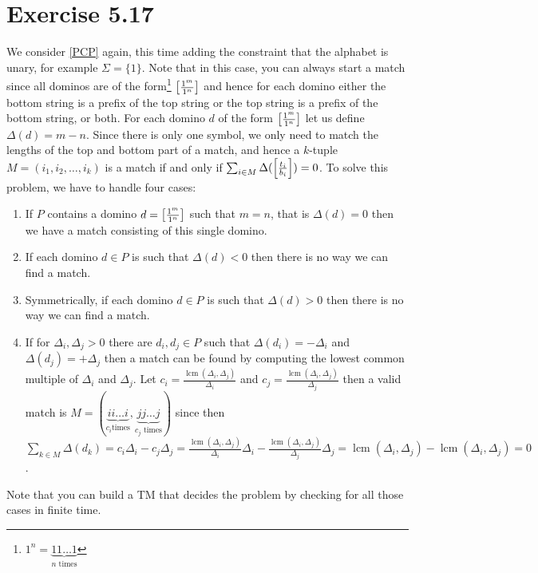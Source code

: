 \documentclass{article}
\begin{document}
\section{Exercise 5.17}
We consider \ref{PCP} again, this time adding the constraint that the alphabet
is unary, for example \(\Sigma = \{1\}\). Note that in this case, you can always start a
match since all dominos are of the form\footnote{\(1^n = \underbrace{11\ldots1}_{n \text{ times}}\)}
\(\mleft[\frac{1^m}{1^n}\mright]\)
and hence for each domino either the bottom string is a prefix of the top
string or the top string is a prefix of the bottom string, or both.
For each domino \(d\) of the form \(\mleft[\frac{1^m}{1^n}\mright]\) let us
define \(\Delta(d) = m - n\). Since there is only one symbol,
we only need to match the lengths of the
top and bottom part of a match, and hence a \(k\)-tuple \(M = (i_1,i_2,\ldots,i_k)\)
is a match if and only if \(\sum_{i \in M}
	\Delta(\mleft[\frac{t_i}{b_i}\mright]) = 0\).
To solve this problem, we have to handle four cases:
\begin{enumerate}
	\item If \(P\) contains a domino \(d=\mleft[\frac{1^m}{1^n}\mright]\) such that
		\(m=n\), that is \(\Delta(d) = 0\) then we have a match consisting of this single domino.
	\item If each domino \(d \in P\) is such that \(\Delta(d) < 0\) then there
		is no way we can find a match.
	\item Symmetrically, if each domino \(d \in P\) is such that \(\Delta(d) > 0\) then there
		is no way we can find a match.
	\item If for \(\Delta_i, \Delta_j > 0\) there are \(d_i,d_j \in P\) such
		that \(\Delta(d_i) = -\Delta_i\) and \(\Delta(d_j) = +\Delta_j\) then a
		match can be found by computing the lowest common multiple of
		\(\Delta_i\) and \(\Delta_j\). Let \(c_i =
			\frac{\mathop{lcm}(\Delta_i,\Delta_j)}{\Delta_i}\) and \(c_j =
			\frac{\mathop{lcm}(\Delta_i,\Delta_j)}{\Delta_j}\) then a valid
			match is \(M = (\underbrace{i i \ldots i}_{c_i \text{
							times}},\underbrace{j j \ldots j}_{c_j
			\text{ times}})\) since then \(\sum_{k \in M}
	\Delta(d_k) = c_i \Delta_i - c_j \Delta_j
= \frac{\mathop{lcm}(\Delta_i,\Delta_j)}{\Delta_i} \Delta_i -
\frac{\mathop{lcm}(\Delta_i,\Delta_j)}{\Delta_j} \Delta_j
=\mathop{lcm}(\Delta_i,\Delta_j) - \mathop{lcm}(\Delta_i,\Delta_j)
= 0\).
\end{enumerate}
Note that you can build a TM that decides the problem by checking for all those
cases in finite time.
\end{document}
